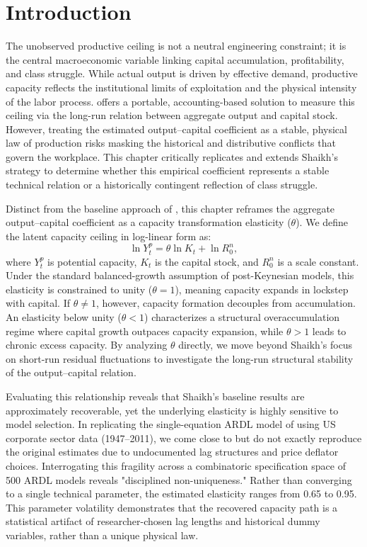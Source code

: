 \section{Introduction}
\label{sec:introduction}

The unobserved productive ceiling is not a neutral engineering constraint; it is the central macroeconomic variable linking capital accumulation, profitability, and class struggle. While actual output is driven by effective demand, productive capacity reflects the institutional limits of exploitation and the physical intensity of the labor process. \citet{Shaikh2016} offers a portable, accounting-based solution to measure this ceiling via the long-run relation between aggregate output and capital stock. However, treating the estimated output–capital coefficient as a stable, physical law of production risks masking the historical and distributive conflicts that govern the workplace. This chapter critically replicates and extends Shaikh’s strategy to determine whether this empirical coefficient represents a stable technical relation or a historically contingent reflection of class struggle.

Distinct from the baseline approach of \citet{Shaikh2016}, this chapter reframes the aggregate output–capital coefficient as a capacity transformation elasticity ($\theta$). We define the latent capacity ceiling in log-linear form as:
\begin{equation}
\ln Y^p_t = \theta \ln K_t + \ln R^n_0,
\end{equation}
where $Y^p_t$ is potential capacity, $K_t$ is the capital stock, and $R^n_0$ is a scale constant. Under the standard balanced-growth assumption of post-Keynesian models, this elasticity is constrained to unity ($\theta = 1$), meaning capacity expands in lockstep with capital. If $\theta \neq 1$, however, capacity formation decouples from accumulation. An elasticity below unity ($\theta < 1$) characterizes a structural overaccumulation regime where capital growth outpaces capacity expansion, while $\theta > 1$ leads to chronic excess capacity. By analyzing $\theta$ directly, we move beyond Shaikh’s focus on short-run residual fluctuations to investigate the long-run structural stability of the output–capital relation.

Evaluating this relationship reveals that Shaikh's baseline results are approximately recoverable, yet the underlying elasticity is highly sensitive to model selection. In replicating the single-equation ARDL model of \citet{Shaikh2016} using US corporate sector data (1947–2011), we come close to but do not exactly reproduce the original estimates due to undocumented lag structures and price deflator choices. Interrogating this fragility across a combinatoric specification space of 500 ARDL models reveals "disciplined non-uniqueness." Rather than converging to a single technical parameter, the estimated elasticity ranges from 0.65 to 0.95. This parameter volatility demonstrates that the recovered capacity path is a statistical artifact of researcher-chosen lag lengths and historical dummy variables, rather than a unique physical law.


